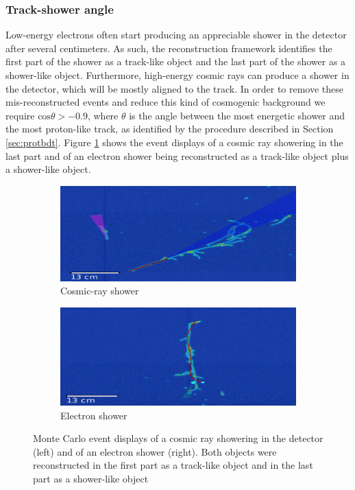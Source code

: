 \subsubsection{Track-shower angle}
Low-energy electrons often start producing an appreciable shower in the detector after several centimeters. As such, the reconstruction framework identifies the first part of the shower as a track-like object and the last part of the shower as a shower-like object. 
Furthermore, high-energy cosmic rays can produce a shower in the detector, which will be mostly aligned to the track. In order to remove these mis-reconstructed events and reduce this kind of cosmogenic background we require $\mathrm{cos}\theta > -0.9$, where $\theta$ is the angle between the most energetic shower and the most proton-like track, as identified by the procedure described in Section \ref{sec:protbdt}.
Figure \ref{fig:angle} shows the event displays of a cosmic ray showering in the last part and of an electron shower being reconstructed as a track-like object plus a shower-like object.

\begin{figure}[htbp]
\centering
  \begin{subfigure}{0.45\textwidth}
    \includegraphics[width=\linewidth]{figures/angle1.png}
    \caption{Cosmic-ray shower} 
  \end{subfigure}
    \begin{subfigure}{0.45\textwidth}
    \includegraphics[width=\linewidth]{figures/angle2.png}
    \caption{Electron shower} 
  \end{subfigure}
  \caption{Monte Carlo event displays of a cosmic ray showering in the detector (left) and of an electron shower (right). Both objects were reconstructed in the first part as a track-like object and in the last part as a shower-like object}\label{fig:angle}
\end{figure}


